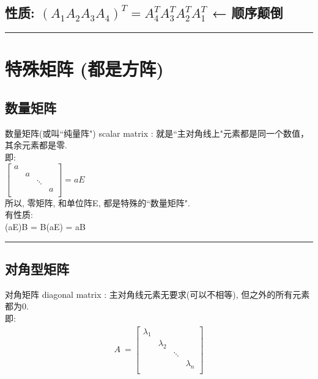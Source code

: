 \documentclass[UTF8]{ctexart}
\begin{document}
\subsection{性质: $(A_1 A_2 A_3 A_4)^T = A_4^T  A_3^T  A_2^T  A_1^T$ ← 顺序颠倒}

\hrule


\section{特殊矩阵 (都是方阵)}

\subsection{数量矩阵}

数量矩阵(或叫``纯量阵") scalar matrix : 就是``主对角线上"元素都是同一个数值，其余元素都是零. \\
即: \\
$
\left[ \begin{matrix}
	a&		&		&		\\
	&		a&		&		\\
	&		&		\ddots&		\\
	&		&		&		a\\
\end{matrix} \right]  
= aE
$\\

所以, 零矩阵, 和单位阵E, 都是特殊的``数量矩阵". \\

有性质: \\
(aE)B = B(aE) = aB \\


\hrule


\subsection{对角型矩阵}

对角矩阵 diagonal matrix : 主对角线元素无要求(可以不相等), 但之外的所有元素都为0.\\

即: 
\begin{align}
	A\ =\left[ \begin{matrix}
		\lambda _1&		&		&		\\
		&		\lambda _2&		&		\\
		&		&		\ddots&		\\
		&		&		&		\lambda _n\\
	\end{matrix} \right]
\end{align}
\end{document}
